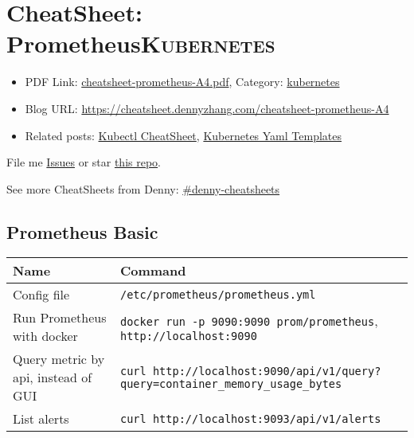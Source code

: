 \documentclass[8pt]{article}
\author{Denny Zhang}
\date{\today}
\title{}
\begin{document}
\section[CheatSheet: Prometheus]{CheatSheet: Prometheus\hfill{}\textsc{Kubernetes}}
\label{sec:orgb07d4f3}
\begin{itemize}
\item PDF Link: \href{https://github.com/dennyzhang/cheatsheet.dennyzhang.com/blob/master/cheatsheet-prometheus-A4/cheatsheet-prometheus-A4.pdf}{cheatsheet-prometheus-A4.pdf}, Category: \href{https://cheatsheet.dennyzhang.com/category/kubernetes/}{kubernetes}
\item Blog URL: \url{https://cheatsheet.dennyzhang.com/cheatsheet-prometheus-A4}
\item Related posts: \href{https://cheatsheet.dennyzhang.com/cheatsheet-kubernetes-A4}{Kubectl CheatSheet}, \href{https://cheatsheet.dennyzhang.com/cheatsheet-kubernetes-yaml}{Kubernetes Yaml Templates}
\end{itemize}

File me \href{https://github.com/dennyzhang/cheatsheet-prometheus-A4/issues}{Issues} or star \href{https://github.com/DennyZhang/cheatsheet-prometheus-A4}{this repo}.

See more CheatSheets from Denny: \href{https://github.com/topics/denny-cheatsheets}{\#denny-cheatsheets}
\subsection{Prometheus Basic}
\label{sec:orgbc00e11}
\begin{center}
\begin{tabular}{ll}
Name & Command\\
\hline
Config file & \texttt{/etc/prometheus/prometheus.yml}\\
Run Prometheus with docker & \texttt{docker run -p 9090:9090 prom/prometheus}, \texttt{http://localhost:9090}\\
Query metric by api, instead of GUI & \texttt{curl http://localhost:9090/api/v1/query?query=container\_memory\_usage\_bytes}\\
List alerts & \texttt{curl http://localhost:9093/api/v1/alerts}\\
\end{tabular}
\end{center}
\end{document}
